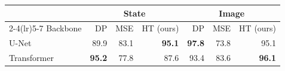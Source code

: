\begin{table}[t]
  \vspace{2pt}
  \begin{tabular*}{\textwidth}{@{\extracolsep{\fill}}lrrrrrr@{}}
    \toprule
    & \multicolumn{3}{c}{State} & \multicolumn{3}{c}{Image} \\
    \cmidrule(lr){2-4}\cmidrule(lr){5-7}
    Backbone & DP & MSE & HT (ours) & DP & MSE & HT (ours) \\
    \midrule
    U-Net       & 89.9 & 83.1 & \textbf{95.1} & \textbf{97.8} & 73.8 & 95.1 \\
    Transformer & \textbf{95.2} & 77.8 & 87.6 & 93.4 & 83.6 & \textbf{96.1} \\
    \bottomrule
  \end{tabular*}
\end{table}
